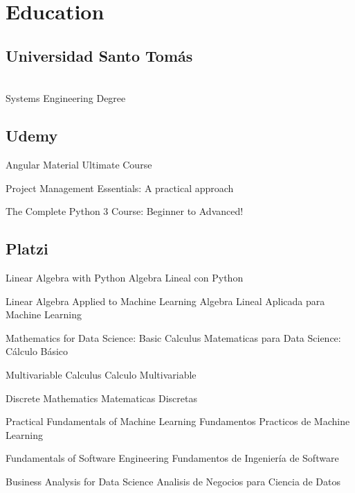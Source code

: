 \section{Education}
\reducespace
\begin{multicols}{2}\raggedcolumns%
	\subsection{Universidad Santo Tomás}
	\\[4pt]
	Systems Engineering Degree\\

	\subsection{Udemy}
	\begin{cvlist}
		\cvitem
		{Angular Material Ultimate Course}
		{}
		
		\cvitem
		{Project Management Essentials: A practical approach}
		{}
		
		\cvitem
		{The Complete Python 3 Course: Beginner to Advanced!}
		{}
	\end{cvlist}	

	\subsection{Platzi}
	\begin{cvlist}
		
		\cvitem
		{Linear Algebra with Python}
		{Algebra Lineal con Python}
		
		\cvitem
		{Linear Algebra Applied to Machine Learning}
		{Algebra Lineal Aplicada para Machine Learning}
		
		\cvitem
		{Mathematics for Data Science: Basic Calculus}
		{Matematicas para Data Science: Cálculo Básico}
		
		\cvitem
		{Multivariable Calculus}
		{Calculo Multivariable}
		
		\cvitem
		{Discrete Mathematics}
		{Matematicas Discretas}
				
		\cvitem
		{Practical Fundamentals of Machine Learning}
		{Fundamentos Practicos de Machine Learning}
		
		\cvitem
		{Fundamentals of Software Engineering}
		{Fundamentos de Ingeniería de Software}
		
		\cvitem
		{Business Analysis for Data Science}
		{Analisis de Negocios para Ciencia de Datos}
				

\end{cvlist}
\end{multicols}
